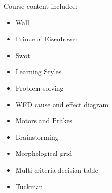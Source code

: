 Course content included:
\begin{itemize}
    \item Wall
    \item Prince of Eisenhower
    \item Swot
    \item Learning Styles
    \item Problem solving
    \item WFD cause and effect diagram
    \item Motors and Brakes
    \item Brainstorming
    \item Morphological grid
    \item Multi-criteria decision table
    \item Tuckman
\end{itemize}